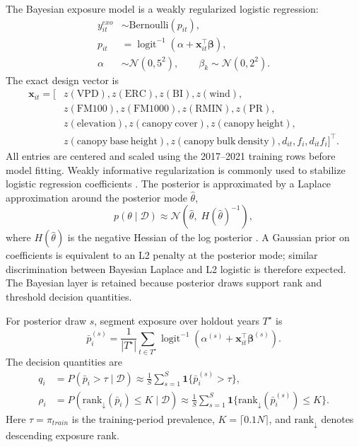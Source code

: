 \documentclass[11pt]{article}
\newcommand{\ind}{\mathbf{1}}
\DeclareMathOperator{\logit}{logit}
\begin{document}
The Bayesian exposure model is a weakly regularized logistic regression:
\begin{align}
  y^{exo}_{it} &\sim \mathrm{Bernoulli}(p_{it}), \\
  p_{it} &= \logit^{-1}(\alpha+\mathbf{x}_{it}^{\top}\boldsymbol{\beta}),\\
  \alpha &\sim \mathcal{N}(0,5^2), \qquad
  \beta_k \sim \mathcal{N}(0,2^2).
\end{align}
The exact design vector is
\begin{equation}
\begin{split}
\mathbf{x}_{it} =
[
&z(\mathrm{VPD}), z(\mathrm{ERC}), z(\mathrm{BI}), z(\mathrm{wind}),\\
&z(\mathrm{FM100}), z(\mathrm{FM1000}), z(\mathrm{RMIN}), z(\mathrm{PR}),\\
&z(\mathrm{elevation}), z(\mathrm{canopy\ cover}), z(\mathrm{canopy\ height}),\\
&z(\mathrm{canopy\ base\ height}), z(\mathrm{canopy\ bulk\ density}),
d_{it}, f_i, d_{it}f_i
]^\top .
\end{split}
\label{eq:x-vector}
\end{equation}
All entries are centered and scaled using the 2017--2021 training rows before
model fitting.
Weakly informative regularization is commonly used to stabilize logistic
regression coefficients \citep{gelman2008weakPriors}. The posterior is
approximated by a Laplace approximation around the posterior mode
$\hat{\theta}$,
\begin{equation}
  p(\theta \mid \mathcal{D}) \approx
  \mathcal{N}\left(\hat{\theta},\; H(\hat{\theta})^{-1}\right),
\end{equation}
where $H(\hat{\theta})$ is the negative Hessian of the log posterior
\citep{tierneyKadane1986laplace}. A Gaussian prior on coefficients is
equivalent to an L2 penalty at the posterior mode; similar discrimination
between Bayesian Laplace and L2 logistic is therefore expected. The Bayesian
layer is retained because posterior draws support rank and threshold decision
quantities.

For posterior draw $s$, segment exposure over holdout years $T^\star$ is
\begin{equation}
  \bar{p}_{i}^{(s)}
  =
  \frac{1}{|T^\star|}
  \sum_{t\in T^\star} \logit^{-1}
  \left(\alpha^{(s)}+\mathbf{x}_{it}^{\top}\boldsymbol{\beta}^{(s)}\right).
\end{equation}
The decision quantities are
\begin{align}
  q_i
  &= P(\bar{p}_i > \tau \mid \mathcal{D})
  \approx
  \frac{1}{S}\sum_{s=1}^{S}
  \ind\{\bar{p}_{i}^{(s)}>\tau\},\\
  \rho_i
  &= P(\mathrm{rank}_{\downarrow}(\bar{p}_i) \le K \mid \mathcal{D})
  \approx
  \frac{1}{S}\sum_{s=1}^{S}
  \ind\{\mathrm{rank}_{\downarrow}(\bar{p}_{i}^{(s)})\le K\}.
\end{align}
Here $\tau=\pi_{train}$ is the training-period prevalence, $K=\lceil0.1N\rceil$,
and $\mathrm{rank}_{\downarrow}$ denotes descending exposure rank.
\end{document}
